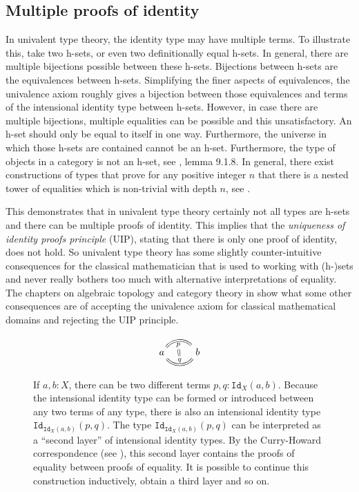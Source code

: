 \documentclass[12pt,a4paper,twoside,xetex]{book} %
\newcommand{\keyword}[1]{\emph{#1}\index{#1}}
\newcommand{\op}[1]{\mathtt{#1}}
\begin{document}
\subsection{Multiple proofs of identity}

In univalent type theory, the identity type may have multiple terms. To illustrate this, take two h-sets, or even two definitionally equal h-sets. In general, there are 
multiple bijections possible between these h-sets. Bijections between h-sets 
are the equivalences between h-sets. Simplifying the finer aspects of 
equivalences, the univalence axiom roughly gives a bijection between those equivalences and terms of the intensional identity 
type between h-sets. However, in case there are multiple bijections, 
multiple equalities can be possible and this unsatisfactory. An h-set should only be equal to 
itself in one way. Furthermore, the universe in which those h-sets are contained 
cannot be an h-set. Furthermore, the type of objects in a category is not an h-set, see \cite{Voevodsky2013}, 
lemma 9.1.8. In general, there exist constructions of types that prove for any 
positive integer $n$ that there is a nested tower of equalities which is non-trivial 
with depth $n$, see .  

This demonstrates that in univalent type theory certainly not all types are h-sets and there can be multiple proofs of identity. This implies that the \keyword{uniqueness of identity proofs 
principle} (UIP), stating that there is only one proof of identity, does not hold. So univalent type theory has some slightly 
counter-intuitive consequences for the classical mathematician that is used to 
working with (h-)sets and never really bothers too much with alternative 
interpretations of equality. The chapters on algebraic topology and category 
theory in \cite{Voevodsky2013} show what some other consequences are of 
accepting the univalence axiom for classical mathematical domains and rejecting 
the UIP principle.

\begin{figure}\label{secondleveleq}
 \centering
 
\[ \begin{tikzcd}
a \arrow[equal, r, bend left=50, "p"{name=U, below}]
\arrow[equal, r, bend right=50, "q"{name=D}]
& b
\arrow[equal, r, from=U, to=D]
\end{tikzcd}
\]
 \caption{If $a,b:X$, there can be two different terms $p,q:\op{Id}_X(a,b)$. Because the 
 intensional identity type can be formed or introduced between any two terms of 
 any type, there is also an intensional identity type 
 $\op{Id}_{\op{Id}_X(a,b)}(p,q)$. The type $\op{Id}_{\op{Id}_X(a,b)}(p,q)$ can be interpreted as a 
``second layer'' of intensional identity types. By the Curry-Howard correspondence (see ), this second layer 
contains the proofs of equality between proofs of equality. It is possible to 
continue this construction inductively, obtain a third layer and so on. }
\end{figure}
\end{document}
